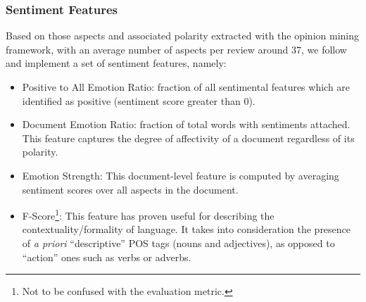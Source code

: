 \subsubsection{Sentiment Features} 

Based on those aspects and associated polarity extracted with the opinion mining framework, with an average number of aspects per review around 37, we follow \cite{Suero2014} and implement a set of sentiment features, namely:

\begin{itemize}
    \item Positive to All Emotion Ratio: fraction of all sentimental features which are identified as positive (sentiment score greater than 0). 
    \item Document Emotion Ratio: fraction of total words with sentiments attached. This feature captures the degree of affectivity of a document regardless of its polarity.
    \item Emotion Strength: This document-level feature is computed by averaging sentiment scores over all aspects in the document.
    \item F-Score\footnote{Not to be confused with the evaluation metric.}: This feature has proven useful for describing the contextuality/formality of language. It takes into consideration the presence of \textit{a priori} ``descriptive'' POS tags (nouns and adjectives), as opposed to ``action'' ones such as verbs or adverbs.
    
\end{itemize}

